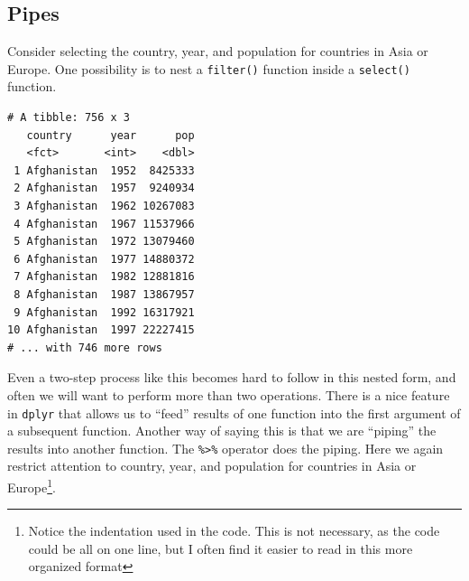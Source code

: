 \documentclass[]{krantz}
\makeatletter
\newenvironment{Shaded}{\begin{snugshade}}{\end{snugshade}}
\newcommand{\KeywordTok}[1]{\textcolor[rgb]{0.27,0.27,0.27}{\textbf{#1}}}
\newcommand{\NormalTok}[1]{#1}
\newcommand{\OperatorTok}[1]{\textcolor[rgb]{0.43,0.43,0.43}{\textbf{#1}}}
\newcommand{\StringTok}[1]{\textcolor[rgb]{0.5,0.5,0.5}{#1}}
\newenvironment{kframe}{%
\medskip{}
\setlength{\fboxsep}{.8em}
 \def\at@end@of@kframe{}%
 \ifinner\ifhmode%
  \def\at@end@of@kframe{\end{minipage}}%
  \begin{minipage}{\columnwidth}%
 \fi\fi%
 \def\FrameCommand##1{\hskip\@totalleftmargin \hskip-\fboxsep
 \colorbox{shadecolor}{##1}\hskip-\fboxsep
     \hskip-\linewidth \hskip-\@totalleftmargin \hskip\columnwidth}%
 \MakeFramed {\advance\hsize-\width
   \@totalleftmargin\z@ \linewidth\hsize
   \@setminipage}}%
 {\par\unskip\endMakeFramed%
 \at@end@of@kframe}
\renewenvironment{Shaded}{\begin{kframe}}{\end{kframe}}
\makeatother
\begin{document}
\hypertarget{pipes}{%
\subsection{Pipes}\label{pipes}}

Consider selecting the country, year, and population for countries in Asia or Europe. One possibility is to nest a \texttt{filter()} function inside a \texttt{select()} function.

\begin{Shaded}
\end{Shaded}

\begin{verbatim}
# A tibble: 756 x 3
   country      year      pop
   <fct>       <int>    <dbl>
 1 Afghanistan  1952  8425333
 2 Afghanistan  1957  9240934
 3 Afghanistan  1962 10267083
 4 Afghanistan  1967 11537966
 5 Afghanistan  1972 13079460
 6 Afghanistan  1977 14880372
 7 Afghanistan  1982 12881816
 8 Afghanistan  1987 13867957
 9 Afghanistan  1992 16317921
10 Afghanistan  1997 22227415
# ... with 746 more rows
\end{verbatim}

Even a two-step process like this becomes hard to follow in this nested form, and often we will want to perform more than two operations. There is a nice feature in \texttt{dplyr} that allows us to ``feed'' results of one function into the first argument of a subsequent function. Another way of saying this is that we are ``piping'' the results into another function. The \texttt{\%\textgreater{}\%} operator does the piping. Here we again restrict attention to country, year, and population for countries in Asia or Europe\footnote{Notice the indentation used in the code. This is not necessary, as the code could be all on one line, but I often find it easier to read in this more organized format}.

\begin{Shaded}
\end{Shaded}
\end{document}

